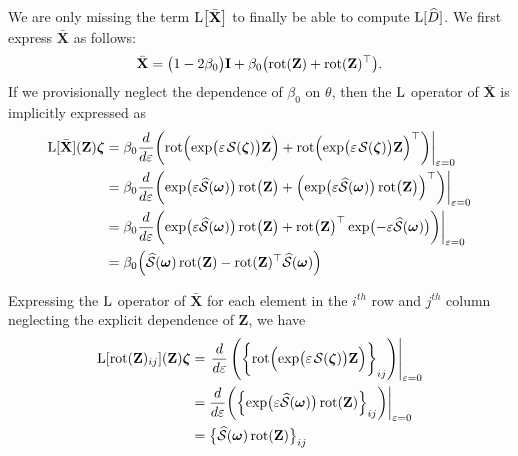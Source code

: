 We are only missing the term $\operatorname{L}\bigl[\bar{\mathbf{X}}\bigr]$ to finally be able to compute $\operatorname{L}[\widehat{D}]$. We first express $\bar{\mathbf{X}}$ as follows:
\begin{align}
    \bar{\mathbf{X}} = \bigl(1-2\beta_0\bigr)\mathbf{I} + \beta_0\bigl(\operatorname{rot}(\mathbf{Z}) + \operatorname{rot}(\mathbf{Z})^\top\bigr).
\end{align}
If we provisionally neglect the dependence of $\beta_0$ on $\theta$, then the $\operatorname{L}$ operator of $\bar{\mathbf{X}}$ is implicitly expressed as
\begin{align}
    \Lop[\bar{\mathbf{X}}](\mathbf{Z})\boldsymbol{\zeta} &= \beta_0\frac{d}{d\varepsilon}\biggl(\rot\Bigl(\exp\bigl(\varepsilon\SL[\boldsymbol{\zeta}]\bigr)\mathbf{Z}\Bigr) + \rot\Bigl(\exp\bigl(\varepsilon\SL[\boldsymbol{\zeta}]\bigr)\mathbf{Z}\Bigr)^\top\biggr)\biggr|_{\varepsilon=0}\\
    &= \beta_0\frac{d}{d\varepsilon}\biggl(\exp \bigl(\varepsilon\widehat{\mathcal{S}}(\boldsymbol{\omega})\bigr)\rot\bigl(\mathbf{Z}\bigr) + \Bigl(\exp \bigl(\varepsilon\widehat{\mathcal{S}}(\boldsymbol{\omega})\bigr)\rot\bigl(\mathbf{Z}\bigr)\Bigr)^\top\biggr)\biggr|_{\varepsilon=0}\\
    &= \beta_0\frac{d}{d\varepsilon}\biggl(\exp \bigl(\varepsilon\widehat{\mathcal{S}}(\boldsymbol{\omega})\bigr)\rot\bigl(\mathbf{Z}\bigr) + \rot\bigl(\mathbf{Z}\bigr)^\top\exp\bigl(-\varepsilon\widehat{\mathcal{S}}(\boldsymbol{\omega})\bigr)\biggr)\biggr|_{\varepsilon=0}\\
    &= \beta_0\Bigl(\widehat{\mathcal{S}}(\boldsymbol{\omega})\rot(\mathbf{Z}) - \rot(\mathbf{Z})^\top\widehat{\mathcal{S}}(\boldsymbol{\omega})\Bigr)
\end{align}

Expressing the $\operatorname{L}$ operator of $\bar{\mathbf{X}}$ for each element in the $i^{th}$ row and $j^{th}$ column neglecting the explicit dependence of $\mathbf{Z}$, we have
\begin{align}
    \Lop[\rot(\mathbf{Z})_{ij}](\mathbf{Z})\boldsymbol{\zeta} &=  \left.\frac{d}{d\varepsilon}\left(\biggl\{\rot\Bigl(\exp\bigl(\varepsilon\SL[\boldsymbol{\zeta}]\bigr)\mathbf{Z}\Bigr)\biggr\}_{ij}\right)\right|_{\varepsilon=0}\\
    &=  \frac{d}{d\varepsilon}\biggl(\Bigl\{\exp\bigl(\varepsilon\widehat{\mathcal{S}}(\boldsymbol{\omega})\bigr)\rot(\mathbf{Z})\Bigr\}_{ij}\biggr)\biggr|_{\varepsilon=0}\\
    &=\bigl\{\widehat{\mathcal{S}}(\boldsymbol{\omega})\rot(\mathbf{Z})\bigr\}_{ij}
\end{align}


